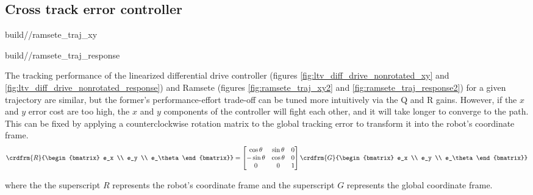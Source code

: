 \subsection{Cross track error controller}
\begin{bookfigure}
  \begin{minisvg}{2}{build/\chapterpath/ramsete_traj_xy}
    \caption{Ramsete nonlinear controller x-y plot}
    \label{fig:ramsete_traj_xy2}
  \end{minisvg}
  \hfill
  \begin{minisvg}{2}{build/\chapterpath/ramsete_traj_response}
    \caption{Ramsete nonlinear controller response}
    \label{fig:ramsete_traj_response2}
  \end{minisvg}
\end{bookfigure}

The tracking performance of the linearized differential drive controller
(figures \ref{fig:ltv_diff_drive_nonrotated_xy} and
\ref{fig:ltv_diff_drive_nonrotated_response}) and Ramsete (figures
\ref{fig:ramsete_traj_xy2} and \ref{fig:ramsete_traj_response2}) for a given
trajectory are similar, but the former's performance-effort trade-off can be
tuned more intuitively via the Q and R gains. However, if the $x$ and $y$ error
cost are too high, the $x$ and $y$ components of the controller will fight each
other, and it will take longer to converge to the path. This can be fixed by
applying a counterclockwise rotation matrix to the global tracking error to
transform it into the robot's coordinate frame.
\begin{equation*}
  \crdfrm{R}{\begin{bmatrix}
    e_x \\
    e_y \\
    e_\theta
  \end{bmatrix}} =
  \begin{bmatrix}
    \cos\theta & \sin\theta & 0 \\
    -\sin\theta & \cos\theta & 0 \\
    0 & 0 & 1
  \end{bmatrix}
  \crdfrm{G}{\begin{bmatrix}
    e_x \\
    e_y \\
    e_\theta
  \end{bmatrix}}
\end{equation*}

where the the superscript $R$ represents the robot's coordinate frame and the
superscript $G$ represents the global coordinate frame.

